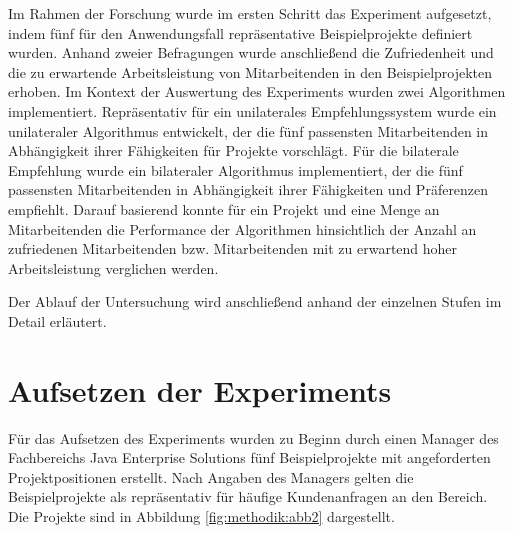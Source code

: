 Im Rahmen der Forschung wurde im ersten Schritt das Experiment aufgesetzt, indem fünf für den Anwendungsfall repräsentative Beispielprojekte definiert wurden.
Anhand zweier Befragungen wurde anschließend die Zufriedenheit und die zu erwartende Arbeitsleistung von Mitarbeitenden in den Beispielprojekten erhoben.
Im Kontext der Auswertung des Experiments wurden zwei Algorithmen implementiert.
Repräsentativ für ein unilaterales Empfehlungssystem wurde ein unilateraler Algorithmus entwickelt, der die fünf passensten Mitarbeitenden in Abhängigkeit ihrer Fähigkeiten für Projekte vorschlägt.
Für die bilaterale Empfehlung wurde ein bilateraler Algorithmus implementiert, der die fünf passensten Mitarbeitenden in Abhängigkeit ihrer Fähigkeiten und Präferenzen empfiehlt.
Darauf basierend konnte für ein Projekt und eine Menge an Mitarbeitenden die Performance der Algorithmen hinsichtlich der Anzahl an zufriedenen Mitarbeitenden bzw. Mitarbeitenden mit zu erwartend hoher Arbeitsleistung verglichen werden.

Der Ablauf der Untersuchung wird anschließend anhand der einzelnen Stufen im Detail erläutert.

\section{Aufsetzen der Experiments}
Für das Aufsetzen des Experiments wurden zu Beginn durch einen Manager des Fachbereichs Java Enterprise Solutions fünf Beispielprojekte mit angeforderten Projektpositionen erstellt.
Nach Angaben des Managers gelten die Beispielprojekte als repräsentativ für häufige Kundenanfragen an den Bereich.
Die Projekte sind in Abbildung \ref{fig:methodik:abb2} dargestellt.


